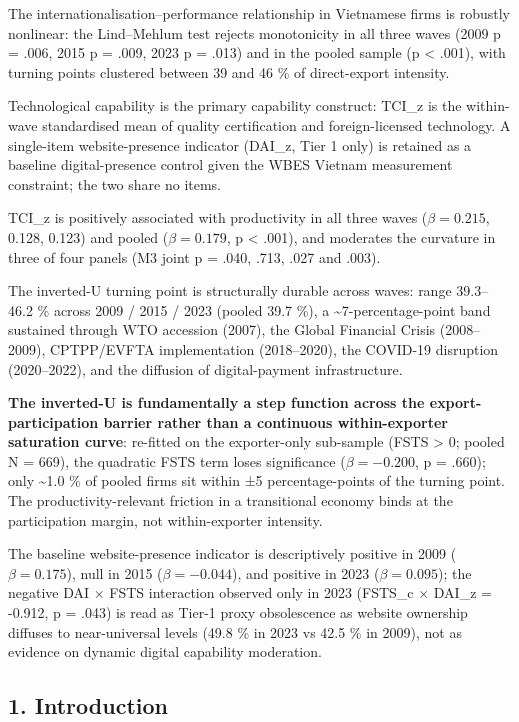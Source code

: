 \documentclass[12pt,a4paper]{article}
\begin{document}
The internationalisation--performance relationship in Vietnamese firms
is robustly nonlinear: the Lind--Mehlum test rejects monotonicity in all
three waves (2009 p = .006, 2015 p = .009, 2023 p = .013) and in the
pooled sample (p \textless{} .001), with turning points clustered
between 39 and 46 \% of direct-export intensity.

Technological capability is the primary capability construct: TCI\_z is
the within-wave standardised mean of quality certification and
foreign-licensed technology. A single-item website-presence indicator
(DAI\_z, Tier 1 only) is retained as a baseline digital-presence control
given the WBES Vietnam measurement constraint; the two share no items.

TCI\_z is positively associated with productivity in all three waves
(\(\beta = 0.215\), 0.128, 0.123) and pooled (\(\beta = 0.179\), p
\textless{} .001), and moderates the curvature in three of four panels
(M3 joint p = .040, .713, .027 and .003).

The inverted-U turning point is structurally durable across waves: range
39.3--46.2 \% across 2009 / 2015 / 2023 (pooled 39.7 \%), a
\textasciitilde7-percentage-point band sustained through WTO accession
(2007), the Global Financial Crisis (2008--2009), CPTPP/EVFTA
implementation (2018--2020), the COVID-19 disruption (2020--2022), and
the diffusion of digital-payment infrastructure.

\textbf{The inverted-U is fundamentally a step function across the
export-participation barrier rather than a continuous within-exporter
saturation curve}: re-fitted on the exporter-only sub-sample (FSTS
\textgreater{} 0; pooled N = 669), the quadratic FSTS term loses
significance (\(\beta = -0.200\), p = .660); only \textasciitilde1.0 \%
of pooled firms sit within ±5 percentage-points of the turning point.
The productivity-relevant friction in a transitional economy binds at
the participation margin, not within-exporter intensity.

The baseline website-presence indicator is descriptively positive in
2009 (\(\beta = 0.175\)), null in 2015 (\(\beta = -0.044\)), and
positive in 2023 (\(\beta = 0.095\)); the negative DAI × FSTS
interaction observed only in 2023 (FSTS\_c × DAI\_z = -0.912, p = .043)
is read as Tier-1 proxy obsolescence as website ownership diffuses to
near-universal levels (49.8 \% in 2023 vs 42.5 \% in 2009), not as
evidence on dynamic digital capability moderation.

\hypertarget{1-introduction}{%
\subsection{1. Introduction}\label{1-introduction}}
\end{document}
